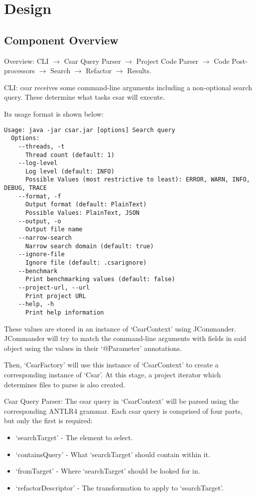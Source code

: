 \documentclass[12pt, letterpaper]{article}
\begin{document}
\section{Design}
\subsection{Component Overview}
Overview:\newline
CLI $\rightarrow$ Csar Query Parser $\rightarrow$ Project Code Parser $\rightarrow$ Code Post-processors $\rightarrow$ Search $\rightarrow$ Refactor $\rightarrow$ Results.

CLI:\newline
csar receives some command-line arguments including a non-optional search query.
These determine what tasks csar will execute.

Its usage format is shown below:
\begin{lstlisting}
Usage: java -jar csar.jar [options] Search query
  Options:
    --threads, -t
      Thread count (default: 1)
    --log-level
      Log level (default: INFO)
      Possible Values (most restrictive to least): ERROR, WARN, INFO, DEBUG, TRACE
    --format, -f
      Output format (default: PlainText)
      Possible Values: PlainText, JSON
    --output, -o
      Output file name
    --narrow-search
      Narrow search domain (default: true)
    --ignore-file
      Ignore file (default: .csarignore)
    --benchmark
      Print benchmarking values (default: false)
    --project-url, --url
      Print project URL
    --help, -h
      Print help information
\end{lstlisting}

These values are stored in an instance of `CsarContext' using JCommander.
JCommander will try to match the command-line arguments with fields in said object using the values in their `@Parameter' annotations.

Then, `CsarFactory' will use this instance of `CsarContext' to create a corresponding instance of `Csar'.
At this stage, a project iterator which determines files to parse is also created.

Csar Query Parser:\newline
The csar query in `CsarContext' will be parsed using the corresponding ANTLR4 grammar. Each csar query is comprised of four parts, but only the first is required:
\begin{itemize}
    \item `searchTarget' - The element to select.
    \item `containsQuery' - What `searchTarget' should contain within it.
    \item `fromTarget' - Where `searchTarget' should be looked for in.
    \item `refactorDescriptor' - The transformation to apply to `searchTarget'.
\end{itemize}
\end{document}
